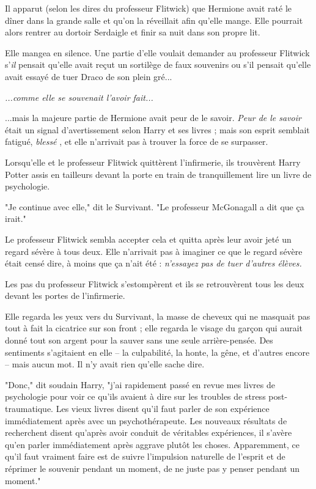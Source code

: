Il apparut (selon les dires du professeur Flitwick) que Hermione avait raté le dîner dans la grande salle et qu'on la réveillait afin qu'elle mange. Elle pourrait alors rentrer au dortoir Serdaigle et finir sa nuit dans son propre lit.

Elle mangea en silence. Une partie d'elle voulait demander au professeur Flitwick s'\emph{il}  pensait qu'elle avait reçut un sortilège de faux souvenirs ou s'il pensait qu'elle avait essayé de tuer Draco de son plein gré...

\emph{...comme elle se souvenait l'avoir fait...} 

...mais la majeure partie de Hermione avait peur de le savoir. \emph{Peur de le savoir}  était un signal d'avertissement selon Harry et ses livres ; mais son esprit semblait fatigué, \emph{blessé} , et elle n'arrivait pas à trouver la force de se surpasser.

Lorsqu'elle et le professeur Flitwick quittèrent l'infirmerie, ils trouvèrent Harry Potter assis en tailleurs devant la porte en train de tranquillement lire un livre de psychologie.

"Je continue avec elle," dit le Survivant. "Le professeur McGonagall a dit que ça irait."

Le professeur Flitwick sembla accepter cela et quitta après leur avoir jeté un regard sévère à tous deux. Elle n'arrivait pas à imaginer ce que le regard sévère était censé dire, à moins que ça n'ait été : \emph{n'essayez pas de tuer d'autres élèves.} 

Les pas du professeur Flitwick s'estompèrent et ils se retrouvèrent tous les deux devant les portes de l'infirmerie.

Elle regarda les yeux vers du Survivant, la masse de cheveux qui ne masquait pas tout à fait la cicatrice sur son front ; elle regarda le visage du garçon qui aurait donné tout son argent pour la sauver sans une seule arrière-pensée. Des sentiments s'agitaient en elle – la culpabilité, la honte, la gêne, et d'autres encore – mais aucun mot. Il n'y avait rien qu'elle sache dire.

"Donc," dit soudain Harry, "j'ai rapidement passé en revue mes livres de psychologie pour voir ce qu'ils avaient à dire sur les troubles de stress post-traumatique. Les vieux livres disent qu'il faut parler de son expérience immédiatement après avec un psychothérapeute. Les nouveaux résultats de recherchent disent qu'après avoir conduit de véritables expériences, il s'avère qu'en parler immédiatement après aggrave plutôt les choses. Apparemment, ce qu'il faut vraiment faire est de suivre l'impulsion naturelle de l'esprit et de réprimer le souvenir pendant un moment, de ne juste pas y penser pendant un moment."

